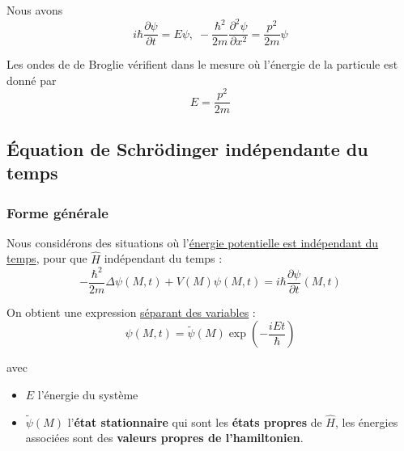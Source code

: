 Nous avons 
\begin{equation}
  i \hbar \frac{\partial \psi}{\partial t} =  E \psi, \; - \frac{\hbar ^{2}}{2m} \frac{\partial ^{2}\psi}{\partial x ^{2}}  = \frac{p ^{2}}{2m}  \psi
\end{equation}

Les ondes de de Broglie vérifient dans le mesure où l'énergie de la particule est donné par
\begin{equation}
  E = \frac{p ^{2}}{2m} 
\end{equation}




\subsection{Équation de Schrödinger indépendante du temps} %
\label{sec:Équation de Schrödinger indépendante du temps}


\subsubsection{Forme générale} %
\label{sub:Forme générale}

Nous considérons des situations où l'\underline{énergie potentielle est indépendant du temps}, pour que $\hat{H}$ indépendant du temps : 
\begin{equation}
  - \frac{\hbar ^{2}}{2m}  \Delta \psi(M,t) + V(M) \psi(M,t) = i\hbar \frac{\partial \psi}{\partial t} (M,t)
\end{equation}

On obtient une expression \underline{séparant des variables} : 
\begin{equation}
  \psi(M,t) = \widetilde{\psi}(M) \exp \left( - \frac{iEt}{\hbar}  \right)
\end{equation}

avec
\begin{itemize}

    \item $E$ l'énergie du système 
    \item $\widetilde{\psi}(M)$ l'\textbf{état stationnaire} qui sont les \textbf{états propres} de $\hat{H}$, les énergies associées sont des \textbf{valeurs propres de l'hamiltonien}.

\end{itemize}

